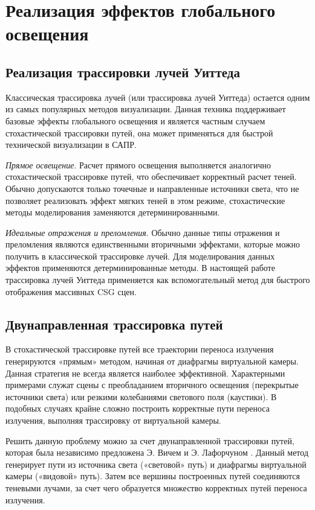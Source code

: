 \section{Реализация эффектов глобального освещения}

\subsection{Реализация трассировки лучей Уиттеда}

Классическая трассировка лучей (или трассировка лучей Уиттеда) остается одним из самых популярных методов визуализации. Данная техника поддерживает базовые эффекты глобального освещения и является частным случаем стохастической трассировки путей, она может применяться для быстрой технической визуализации в САПР.

\textit{Прямое освещение}. Расчет прямого освещения выполняется аналогично стохастической трассировке путей, что обеспечивает корректный расчет теней. Обычно допускаются только точечные и направленные источники света, что не позволяет реализовать эффект мягких теней в этом режиме, стохастические методы моделирования заменяются детерминированными.

\textit{Идеальные отражения и преломления}. Обычно данные типы отражения и преломления являются единственными вторичными эффектами, которые можно получить в классической трассировке лучей. Для моделирования данных эффектов применяются детерминированные методы. В настоящей работе трассировка лучей Уиттеда применяется как вспомогательный метод для быстрого отображения массивных CSG сцен.

\subsection{Двунаправленная трассировка путей}

В стохастической трассировке путей все траектории переноса излучения генерируются «прямым» методом, начиная от диафрагмы виртуальной камеры. Данная стратегия не всегда является наиболее эффективной. Характерными примерами служат сцены с преобладанием вторичного освещения (перекрытые источники света) или резкими колебаниями светового поля (каустики). В подобных случаях крайне сложно построить корректные пути переноса излучения, выполняя трассировку от виртуальной камеры.

Решить данную проблему можно за счет двунаправленной трассировки путей, которая была независимо предложена Э. Вичем  и Э. Лафорчуном . Данный метод генерирует пути из источника света («световой» путь) и диафрагмы виртуальной камеры («видовой» путь). Затем все вершины построенных путей соединяются теневыми лучами, за счет чего образуется множество корректных путей переноса излучения.


